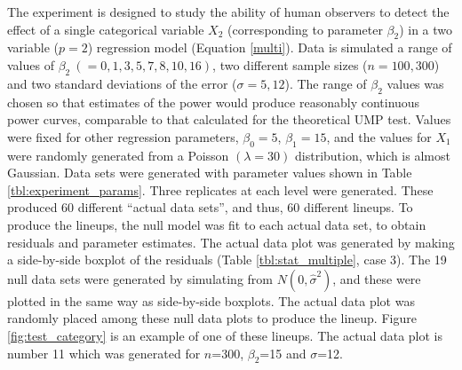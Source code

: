 \documentclass{article}
\begin{document}
The experiment is designed to study the ability of human observers to detect the effect of a single categorical variable $X_2$ (corresponding to parameter $\beta_2$) in a two variable ($p=2$) regression model (Equation \ref{multi}). Data is simulated a range of values of $\beta_2~ (=0, 1, 3, 5, 7, 8, 10, 16)$, two different sample sizes ($n=100, 300$) and two standard deviations of the error ($\sigma=5, 12$). The range of $\beta_2$ values was chosen so that estimates of the power would produce reasonably continuous power curves, comparable to that calculated for the theoretical UMP test. Values were fixed for other regression parameters, $\beta_0 = 5$,  $\beta_1=15$, and the values for $X_1$ were randomly generated from a Poisson $(\lambda=30)$ distribution, which is almost Gaussian. Data sets were generated with parameter values shown in Table \ref{tbl:experiment_params}. Three replicates at each level were generated. These produced 60 different ``actual data sets'', and thus, 60 different lineups. To produce the lineups, the null model was fit to each actual data set, to obtain residuals and parameter estimates. The actual data plot was generated by making a side-by-side boxplot of the residuals (Table \ref{tbl:stat_multiple}, case 3). The 19 null data sets were generated by simulating from  $N(0, {\hat{\sigma}}^2)$, and these were plotted in the same way as side-by-side boxplots. The actual data plot was randomly placed among these null data plots to produce the lineup. Figure \ref{fig:test_category} is an example of one of these lineups. The actual data plot is number 11 which was generated for $n$=300, $\beta_2$=15 and $\sigma$=12.  

\end{document}

